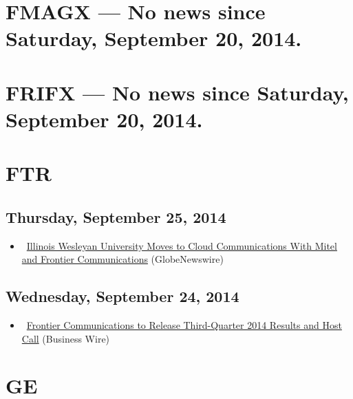 \documentclass[11pt,asymmetric]{article}
\begin{document}
\section*{FMAGX --- No news since Saturday, September 20, 2014.}


\section*{FRIFX --- No news since Saturday, September 20, 2014.}


\section*{FTR}

\subsection*{Thursday, September 25, 2014}
\begin{itemize}
\item\ \href{http://finance.yahoo.com/news/illinois-wesleyan-university-moves-cloud-180000010.html}{Illinois Wesleyan University Moves to Cloud Communications With Mitel and Frontier Communications} (GlobeNewswire)
\end{itemize}
\subsection*{Wednesday, September 24, 2014}
\begin{itemize}
\item\ \href{http://finance.yahoo.com/news/frontier-communications-release-third-quarter-191700815.html}{Frontier Communications to Release Third-Quarter 2014 Results and Host Call} (Business Wire)
\end{itemize}

\section*{GE}
\end{document}
